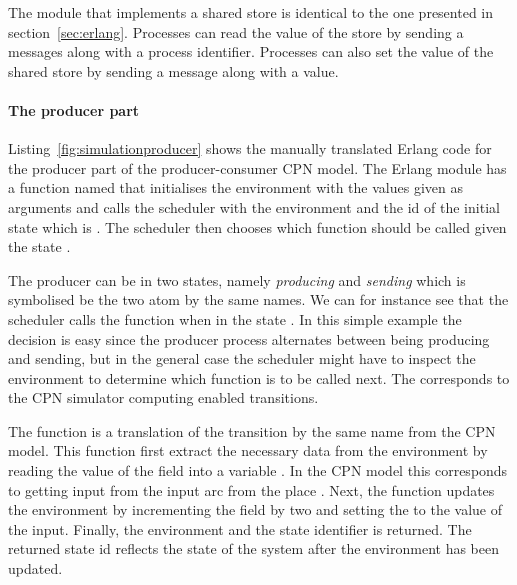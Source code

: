

The module  that implements a shared store is identical to the one presented in section~\ref{sec:erlang}. Processes can read the value of the store by sending a  messages along with a process identifier. Processes can also set the value of the shared store by sending a  message along with a value.

\paragraph{The producer part}
Listing~\ref{fig:simulationproducer} shows the manually translated Erlang code for the producer part of the producer-consumer CPN model. The Erlang module has a function named  that initialises the environment with the values given as arguments and calls the scheduler  with the environment and the id of the initial state which is . The scheduler then chooses which function should be called given the state .



The producer can be in two states, namely \emph{producing} and \emph{sending} which is symbolised be the two atom by the same names. We can for instance see that the scheduler calls the function  when in the state . In this simple example the decision is easy since the producer process alternates between being producing and sending, but in the general case the scheduler might have to inspect the environment to determine which function is to be called next. The corresponds to the CPN simulator computing enabled transitions. 

The function  is a translation of the transition by the same name from the CPN model. This function first extract the necessary data from the environment by reading the value of the  field into a variable . In the CPN model this corresponds to getting input from the input arc from the place . Next, the function updates the environment by incrementing the  field by two and setting the  to the value of the input. Finally, the environment and the state identifier is returned. The returned state id reflects the state of the system after the environment has been updated.

